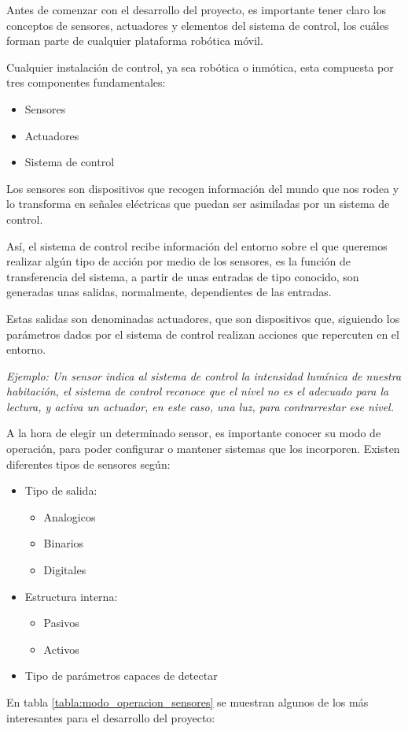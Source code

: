 Antes de comenzar con el desarrollo del proyecto, es importante tener claro los conceptos de sensores, actuadores y elementos del sistema de control, los cuáles forman parte de cualquier plataforma robótica móvil. \newline

Cualquier instalación de control, ya sea robótica o inmótica, esta compuesta por tres componentes fundamentales:
\begin{itemize}
	\item Sensores
	\item Actuadores
	\item Sistema de control
\end{itemize}

Los sensores son dispositivos que recogen información del mundo que nos rodea y lo transforma en señales eléctricas que puedan ser asimiladas por un sistema de control. \newline

Así, el sistema de control recibe información del entorno sobre el que queremos realizar algún tipo de acción por medio de los sensores, es la función de transferencia del sistema, a partir de unas entradas de tipo conocido, son generadas unas salidas, normalmente, dependientes de las entradas. \newline

Estas salidas son denominadas actuadores, que son dispositivos que, siguiendo los parámetros dados por el sistema de control realizan acciones que repercuten en el entorno. \newline

\textsl{Ejemplo: Un sensor indica al sistema de control la intensidad lumínica de nuestra habitación, el sistema de control reconoce que el nivel no es el adecuado para la lectura, y activa un actuador, en este caso, una luz, para contrarrestar ese nivel.}

A la hora de elegir un determinado sensor, es importante conocer su modo de operación, para poder configurar o mantener sistemas que los incorporen. Existen diferentes tipos de sensores según:

\begin{itemize}
	\item Tipo de salida: \begin{itemize}
		\item Analogicos
		\item Binarios
		\item Digitales
	\end{itemize} 
	
	\item Estructura interna: \begin{itemize}
		\item Pasivos
		\item Activos
	\end{itemize}
	
	\item Tipo de parámetros capaces de detectar
\end{itemize}
 En tabla \ref{tabla:modo_operacion_sensores} se muestran algunos de los más interesantes para el desarrollo del proyecto:

